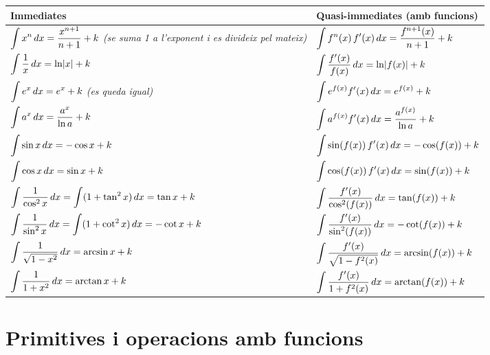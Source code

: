 \begin{table}[!htbp]
\centering
\renewcommand{\arraystretch}{1.75}
\begin{tabularx}{\textwidth}{>{\raggedright\arraybackslash}X>{\raggedright\arraybackslash}X}
\toprule
Immediates & Quasi-immediates (amb funcions) \\
\midrule
$\displaystyle \displaystyle\int x^n\,dx = \dfrac{x^{n+1}}{n+1} + k$ \emph{(se suma 1 a l'exponent i es divideix pel mateix)} & $\displaystyle \displaystyle\int f^n(x)\,f'(x)\,dx = \dfrac{f^{n+1}(x)}{n+1} + k$ \\
$\displaystyle \displaystyle\int \dfrac{1}{x}\,dx = \ln\lvert x\rvert + k$ & $\displaystyle \displaystyle\int \dfrac{f'(x)}{f(x)}\,dx = \ln\lvert f(x)\rvert + k$ \\
$\displaystyle \displaystyle\int e^x\,dx = e^x + k$ \emph{(es queda igual)} & $\displaystyle \displaystyle\int e^{f(x)}f'(x)\,dx = e^{f(x)} + k$ \\
$\displaystyle \displaystyle\int a^x\,dx = \dfrac{a^x}{\ln a} + k$ & $\displaystyle \displaystyle\int a^{f(x)}f'(x)\,dx = \dfrac{a^{f(x)}}{\ln a} + k$ \\
$\displaystyle \displaystyle\int \sin x\,dx = -\cos x + k$ & $\displaystyle \displaystyle\int \sin(f(x))\,f'(x)\,dx = -\cos(f(x)) + k$ \\
$\displaystyle \displaystyle\int \cos x\,dx = \sin x + k$ & $\displaystyle \displaystyle\int \cos(f(x))\,f'(x)\,dx = \sin(f(x)) + k$ \\
$\displaystyle \displaystyle\int \dfrac{1}{\cos^2 x}\,dx = \int (1+\tan^2 x)\,dx = \tan x + k$ & $\displaystyle \displaystyle\int \dfrac{f'(x)}{\cos^2(f(x))}\,dx = \tan(f(x)) + k$ \\
$\displaystyle \displaystyle\int \dfrac{1}{\sin^2 x}\,dx = \int (1+\cot^2 x)\,dx = -\cot x + k$ & $\displaystyle \displaystyle\int \dfrac{f'(x)}{\sin^2(f(x))}\,dx = -\cot(f(x)) + k$ \\
$\displaystyle \displaystyle\int \dfrac{1}{\sqrt{1-x^2}}\,dx = \arcsin x + k$ & $\displaystyle \displaystyle\int \dfrac{f'(x)}{\sqrt{1-f^2(x)}}\,dx = \arcsin(f(x)) + k$ \\
$\displaystyle \displaystyle\int \dfrac{1}{1+x^2}\,dx = \arctan x + k$ & $\displaystyle \displaystyle\int \dfrac{f'(x)}{1+f^2(x)}\,dx = \arctan(f(x)) + k$ \\
\bottomrule
\end{tabularx}
\end{table}

\section{Primitives i operacions amb funcions}

